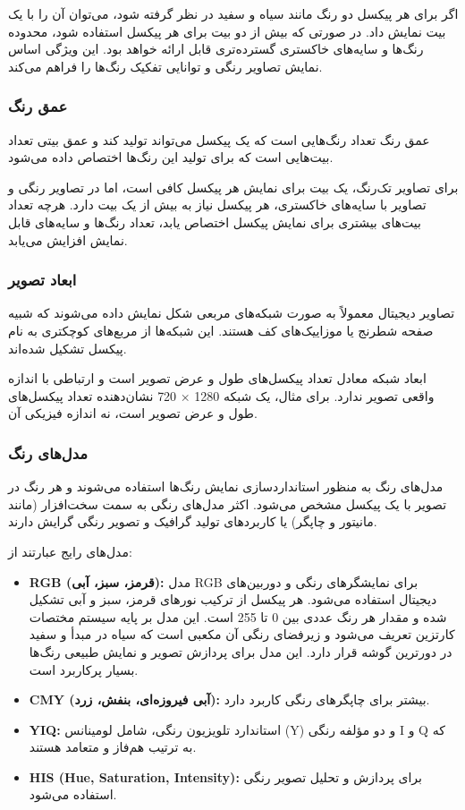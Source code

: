 \documentclass[a4paper,12pt]{report}
\renewcommand{\%}{\lr{\oldpercent}}
\providecommand{\lr}[1]{#1}
\begin{document}
اگر برای هر پیکسل دو رنگ مانند سیاه و سفید در نظر گرفته شود، می‌توان آن را با یک بیت نمایش داد. در صورتی که بیش از دو بیت برای هر پیکسل استفاده شود، محدوده رنگ‌ها و سایه‌های خاکستری گسترده‌تری قابل ارائه خواهد بود. این ویژگی اساس نمایش تصاویر رنگی و توانایی تفکیک رنگ‌ها را فراهم می‌کند.

\subsubsection{عمق رنگ}
عمق رنگ تعداد رنگ‌هایی است که یک پیکسل می‌تواند تولید کند و عمق بیتی تعداد بیت‌هایی است که برای تولید این رنگ‌ها اختصاص داده می‌شود.

برای تصاویر تک‌رنگ، یک بیت برای نمایش هر پیکسل کافی است، اما در تصاویر رنگی و تصاویر با سایه‌های خاکستری، هر پیکسل نیاز به بیش از یک بیت دارد. هرچه تعداد بیت‌های بیشتری برای نمایش پیکسل اختصاص یابد، تعداد رنگ‌ها و سایه‌های قابل نمایش افزایش می‌یابد.

\subsubsection{ابعاد تصویر}
تصاویر دیجیتال معمولاً به صورت شبکه‌های مربعی شکل نمایش داده می‌شوند که شبیه صفحه شطرنج یا موزاییک‌های کف هستند\cite{ref48}. این شبکه‌ها از مربع‌های کوچکتری به نام پیکسل تشکیل شده‌اند.

ابعاد شبکه معادل تعداد پیکسل‌های طول و عرض تصویر است و ارتباطی با اندازه واقعی تصویر ندارد. برای مثال، یک شبکه 1280 × 720 نشان‌دهنده تعداد پیکسل‌های طول و عرض تصویر است، نه اندازه فیزیکی آن.

\subsubsection{مدل‌های رنگ}
مدل‌های رنگ به منظور استانداردسازی نمایش رنگ‌ها استفاده می‌شوند و هر رنگ در تصویر با یک پیکسل مشخص می‌شود\cite{ref49}. اکثر مدل‌های رنگی به سمت سخت‌افزار (مانند مانیتور و چاپگر) یا کاربردهای تولید گرافیک و تصویر رنگی گرایش دارند.

مدل‌های رایج عبارتند از:
\begin{itemize}
    \item \textbf{\lr{RGB} (قرمز، سبز، آبی):} مدل \lr{RGB} برای نمایشگرهای رنگی و دوربین‌های دیجیتال استفاده می‌شود. هر پیکسل از ترکیب نورهای قرمز، سبز و آبی تشکیل شده و مقدار هر رنگ عددی بین 0 تا 255 است. این مدل بر پایه سیستم مختصات کارتزین تعریف می‌شود و زیرفضای رنگی آن مکعبی است که سیاه در مبدأ و سفید در دورترین گوشه قرار دارد. این مدل برای پردازش تصویر و نمایش طبیعی رنگ‌ها بسیار پرکاربرد است.
    \item \textbf{\lr{CMY} (آبی فیروزه‌ای، بنفش، زرد):} بیشتر برای چاپگرهای رنگی کاربرد دارد.
    \item \textbf{\lr{YIQ}:} استاندارد تلویزیون رنگی، شامل لومینانس (\lr{Y}) و دو مؤلفه رنگی \lr{I} و \lr{Q} که به ترتیب هم‌فاز و متعامد هستند.
    \item \textbf{\lr{HIS} (\lr{Hue}, \lr{Saturation}, \lr{Intensity}):} برای پردازش و تحلیل تصویر رنگی استفاده می‌شود.
\end{itemize}
\end{document}
